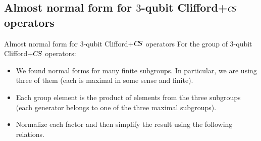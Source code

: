 \documentclass[compress,noamsthm,hyperref={bookmarksopen=true},aspectratio=169]{beamer}
\begin{document}
\subsection{Almost normal form for $3$-qubit Clifford+$C\kern-.16667em S$ operators}
\begin{frame}{Almost normal form for $3$-qubit Clifford+$C\kern-.16667em S$ operators}
  For the group of $3$-qubit Clifford+$C\kern-.16667em S$ operators:
  \vspace{0.75cm}
  \begin{itemize}
    \setlength\itemsep{1.4em}
    
  \item We found normal forms for many finite subgroups. In particular, we are using three of them (each is maximal in some sense and finite).
  \item Each group element is the product of elements from the three
    subgroups (each generator belongs to one of the three maximal
    subgroups).
    \item Normalize each factor and then simplify the result using the following relations.
  \end{itemize}
  
\end{frame}
\end{document}
